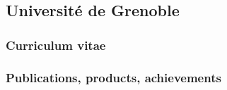 \subsection*{Université de Grenoble}




\subsubsection*{Curriculum vitae}





%

\subsubsection*{Publications, products, achievements}

